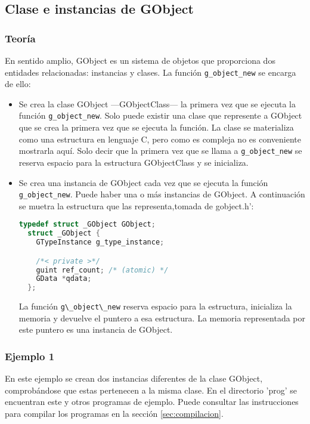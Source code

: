 \subsection{Clase e instancias de \textsf{GObject}} \label{subsec:clase_instancias_gobject}

\subsubsection{Teoría}
En sentido amplio, \textsf{GObject} es un sistema de objetos que proporciona dos entidades relacionadas: instancias y clases. La función \texttt{g\_object\_new} se
encarga de ello:
\begin{itemize}
  \tightlist
\item Se crea la clase \textsf{GObject} ---\textsf{GObjectClass}--- la primera vez que
  se ejecuta la función \texttt{g\_object\_new}. Solo puede existir una clase que
  represente a \textsf{GObject} que se crea la primera vez que se ejecuta la función.
  La clase se materializa como una estructura en lenguaje C, pero como es compleja no es
  conveniente mostrarla aquí. Solo decir que la primera vez que se llama a \texttt{g\_object\_new} se reserva espacio para la estructura \textsf{GObjectClass} y se
  inicializa.
\item Se crea una instancia de \textsf{GObject} cada vez que se ejecuta la función
  \texttt{g\_object\_new}. Puede haber una o más instancias de \textsf{GObject}.
  A continuación se muetra la estructura que las representa,tomada de \textsf{gobject.h}':
\begin{lstlisting}[language=C]
  typedef struct _GObject GObject;
  struct _GObject {
    GTypeInstance g_type_instance;

    /*< private >*/
    guint ref_count; /* (atomic) */
    GData *qdata;
  };
\end{lstlisting}
La función \passthrough{\lstinline!g\_object\_new!} reserva espacio para la estructura,
inicializa la memoria y devuelve el puntero a esa estructura. La memoria representada por este puntero es una instancia de \textsf{GObject}.
\end{itemize}

\subsubsection{Ejemplo 1}
En este ejemplo se crean dos instancias diferentes de la clase \textsf{GObject}, comprobándose que estas pertenecen a la misma clase. En el directorio '\textsf{prog}' se
encuentran este y otros programas de ejemplo. Puede consultar las instrucciones para
compilar los programas en la sección \ref{sec:compilacion}.

